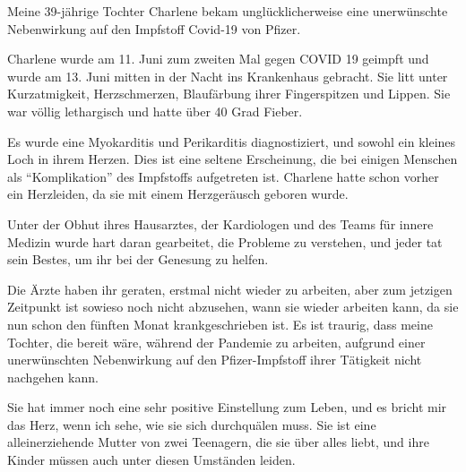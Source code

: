 Meine 39-jährige Tochter Charlene bekam unglücklicherweise eine unerwünschte
Nebenwirkung auf den Impfstoff Covid-19 von Pfizer.

Charlene wurde am 11. Juni zum zweiten Mal gegen COVID 19 geimpft und wurde am
13. Juni mitten in der Nacht ins Krankenhaus gebracht. Sie litt unter
Kurzatmigkeit, Herzschmerzen, Blaufärbung ihrer Fingerspitzen und Lippen. Sie
war völlig lethargisch und hatte über 40 Grad Fieber.

Es wurde eine Myokarditis und Perikarditis diagnostiziert, und sowohl ein
kleines Loch in ihrem Herzen. Dies ist eine seltene Erscheinung, die bei einigen
Menschen als ``Komplikation'' des Impfstoffs aufgetreten ist. Charlene hatte
schon vorher ein Herzleiden, da sie mit einem Herzgeräusch geboren wurde.

Unter der Obhut ihres Hausarztes, der Kardiologen und des Teams für innere
Medizin wurde hart daran gearbeitet, die Probleme zu verstehen, und jeder tat
sein Bestes, um ihr bei der Genesung zu helfen.

Die Ärzte haben ihr geraten, erstmal nicht wieder zu arbeiten, aber zum jetzigen
Zeitpunkt ist sowieso noch nicht abzusehen, wann sie wieder arbeiten kann, da
sie nun schon den fünften Monat krankgeschrieben ist. Es ist traurig, dass meine
Tochter, die bereit wäre, während der Pandemie zu arbeiten, aufgrund einer
unerwünschten Nebenwirkung auf den Pfizer-Impfstoff ihrer Tätigkeit nicht
nachgehen kann.

Sie hat immer noch eine sehr positive Einstellung zum Leben, und es bricht mir
das Herz, wenn ich sehe, wie sie sich durchquälen muss. Sie ist eine
alleinerziehende Mutter von zwei Teenagern, die sie über alles liebt, und ihre
Kinder müssen auch unter diesen Umständen leiden.
